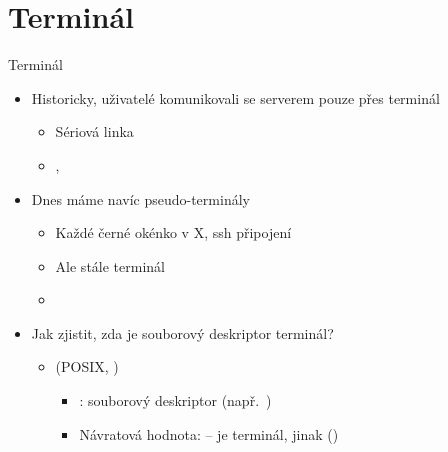 

\section{Terminál}
\frame{\sectionpage}

\begin{frame}{Terminál}

  \begin{itemize}
    \item Historicky, uživatelé komunikovali se serverem pouze přes terminál
    \begin{itemize}
      \item Sériová linka
      \item {}, 
    \end{itemize}

    \pause

    \item Dnes máme navíc pseudo-terminály
    \begin{itemize}
      \item Každé černé okénko v X, ssh připojení
      \item Ale stále terminál
      \item {}
    \end{itemize}

    \pause

    \item Jak zjistit, zda je souborový deskriptor terminál?

    \pause

    \begin{itemize}
      \item {} (POSIX, )
      \begin{itemize}
	\item {}: souborový deskriptor (např.\ )
	\item Návratová hodnota:  --  je terminál, jinak
	   ()
      \end{itemize}
    \end{itemize}

  \end{itemize}

\end{frame}


